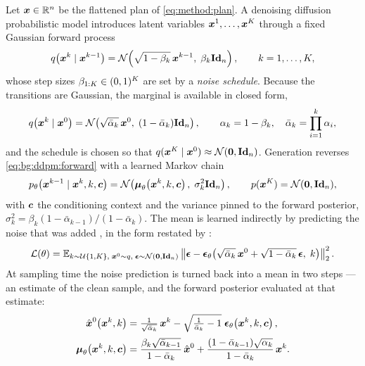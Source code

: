 Let $\boldsymbol{x} \in \mathbb{R}^{n}$ be the flattened plan of \eqref{eq:method:plan}. A denoising diffusion probabilistic model
\parencite{sohl2015deep,ho2020denoising} introduces latent variables
$\boldsymbol{x}^{1},\dots,\boldsymbol{x}^{K}$ through a fixed Gaussian forward process
\begin{equation}\label{eq:bg:ddpm:forward}
  q\!\left(\boldsymbol{x}^{k} \mid \boldsymbol{x}^{k-1}\right)
  = \mathcal{N}\!\left(\sqrt{1-\beta_{k}}\,\boldsymbol{x}^{k-1},\; \beta_{k}\textbf{Id}_{n}\right),
  \qquad k = 1,\dots,K ,
\end{equation}
whose step sizes $\beta_{1:K} \in (0,1)^{K}$ are set by a \emph{noise schedule}. Because
the transitions are Gaussian, the marginal is available in closed form,
\begin{equation}\label{eq:bg:ddpm:marginal}
  q\!\left(\boldsymbol{x}^{k} \mid \boldsymbol{x}^{0}\right)
  = \mathcal{N}\!\left(\sqrt{\bar{\alpha}_{k}}\,\boldsymbol{x}^{0},\;(1-\bar{\alpha}_{k})\textbf{Id}_{n}\right),
  \qquad
  \alpha_{k} = 1-\beta_{k}, \quad \bar{\alpha}_{k} = \prod_{i=1}^{k}\alpha_{i},
\end{equation}
and the schedule is chosen so that $q(\boldsymbol{x}^{K}\mid\boldsymbol{x}^{0}) \approx \mathcal{N}(\boldsymbol{0},\textbf{Id}_{n})$.
Generation reverses \eqref{eq:bg:ddpm:forward} with a learned Markov chain
\begin{equation}\label{eq:bg:ddpm:reverse}
  p_{\theta}\!\left(\boldsymbol{x}^{k-1}\mid\boldsymbol{x}^{k},k,\boldsymbol{c}\right)
  = \mathcal{N}\!\left(\boldsymbol{\mu}_{\theta}\!\left(\boldsymbol{x}^{k},k,\boldsymbol{c}\right),\;\sigma_{k}^{2}\textbf{Id}_{n}\right),
  \qquad p(\boldsymbol{x}^{K}) = \mathcal{N}(\boldsymbol{0},\textbf{Id}_{n}),
\end{equation}
with $\boldsymbol{c}$ the conditioning context and the variance pinned to the forward posterior,
$\sigma_{k}^{2} = \beta_{k}(1-\bar{\alpha}_{k-1})/(1-\bar{\alpha}_{k})$. The mean is learned
indirectly by predicting the noise that was added \parencite{ho2020denoising}, in the form
restated by \parencite[Sec.~4]{romer2025diffusion}:
\begin{equation}\label{eq:bg:ddpm:loss}
  \mathcal{L}(\theta)
  = \mathbb{E}_{k \sim \mathcal{U}\{1,K\},\; \boldsymbol{x}^{0}\sim q,\; \boldsymbol{\epsilon}\sim\mathcal{N}(\boldsymbol{0},\textbf{Id}_{n})}
    \left\|\boldsymbol{\epsilon} - \boldsymbol{\epsilon}_{\theta}\!\left(
      \sqrt{\bar{\alpha}_{k}}\,\boldsymbol{x}^{0} + \sqrt{1-\bar{\alpha}_{k}}\,\boldsymbol{\epsilon},\;k\right)\right\|_{2}^{2}.
\end{equation}
At sampling time the noise prediction is turned back into a mean in two steps --- an estimate of
the clean sample, and the forward posterior evaluated at that estimate:
\begin{align}
  \hat{\boldsymbol{x}}^{0}\!\left(\boldsymbol{x}^{k},k\right)
    &= \tfrac{1}{\sqrt{\bar{\alpha}_{k}}}\,\boldsymbol{x}^{k}
       - \sqrt{\tfrac{1}{\bar{\alpha}_{k}}-1}\;\boldsymbol{\epsilon}_{\theta}\!\left(\boldsymbol{x}^{k},k,\boldsymbol{c}\right),
       \label{eq:bg:ddpm:x0} \\[2pt]
  \boldsymbol{\mu}_{\theta}\!\left(\boldsymbol{x}^{k},k,\boldsymbol{c}\right)
    &= \frac{\beta_{k}\sqrt{\bar{\alpha}_{k-1}}}{1-\bar{\alpha}_{k}}\,\hat{\boldsymbol{x}}^{0}
     + \frac{(1-\bar{\alpha}_{k-1})\sqrt{\alpha_{k}}}{1-\bar{\alpha}_{k}}\,\boldsymbol{x}^{k}.
       \label{eq:bg:ddpm:mean}
\end{align}
